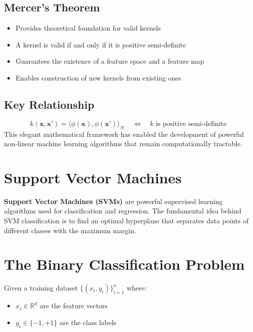 \documentclass{tufte-handout}
\begin{document}
\subsection{Mercer's Theorem}
\begin{itemize}
    \item Provides theoretical foundation for valid kernels
    \item A kernel is valid if and only if it is positive semi-definite
    \item Guarantees the existence of a feature space and a feature map
    \item Enables construction of new kernels from existing ones
\end{itemize}

\subsection{Key Relationship}
\begin{equation}
k(\mathbf{x}, \mathbf{x}') = \langle \phi(\mathbf{x}), \phi(\mathbf{x}') \rangle_{\mathcal{H}} \quad \Leftrightarrow \quad k \text{ is positive semi-definite}
\end{equation}
This elegant mathematical framework has enabled the development of powerful non-linear machine learning algorithms that remain computationally tractable.


\section{Support Vector Machines }

\textbf{Support Vector Machines (SVMs)} are powerful supervised learning algorithms used for classification and regression. The fundamental idea behind SVM classification is to find an optimal hyperplane that separates data points of different classes with the maximum margin.

\section{The Binary Classification Problem}

Given a training dataset $\{(x_i, y_i)\}_{i=1}^{n}$ where:
\begin{itemize}
    \item $x_i \in \mathbb{R}^d$ are the feature vectors
    \item $y_i \in \{-1, +1\}$ are the class labels
\end{itemize}
\end{document}
